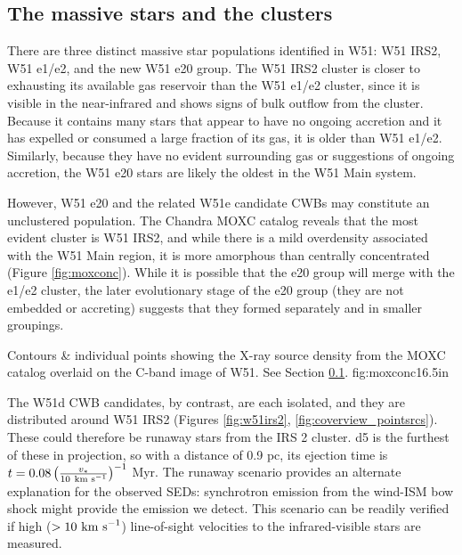 \subsection{The massive stars and the clusters}
\label{sec:mstarscluster}
There are three distinct massive star populations identified in W51: W51 IRS2,
W51 e1/e2, and the new W51 e20 group.  The W51 IRS2 cluster is closer to
exhausting its available gas reservoir than the W51 e1/e2 cluster, since it is
visible in the near-infrared and shows signs of bulk outflow from the cluster.
Because it contains many stars that appear to have no ongoing accretion and it
has expelled or consumed a large fraction of its gas, it is older than W51
e1/e2.  Similarly, because they have no evident surrounding gas or suggestions
of ongoing accretion, the W51 e20 stars are likely the oldest in the W51 Main
system.

However, W51 e20 and the related W51e candidate CWBs may constitute an
unclustered population.  The Chandra MOXC catalog \citep{Townsley2014a} reveals
that the most evident cluster is W51 IRS2, and while there is a mild
overdensity associated with the W51 Main region, it is more amorphous than
centrally concentrated (Figure \ref{fig:moxconc}).  While it is possible that
the e20 group will merge with the e1/e2 cluster, the later evolutionary stage
of the e20 group (they are not embedded or accreting) suggests that they formed
separately and in smaller groupings.

{Contours \& individual points showing the X-ray source density from the 
MOXC \citep{Townsley2014a} catalog overlaid on the C-band image of W51.
See Section \ref{sec:mstarscluster}.}
{fig:moxconc}{1}{6.5in}

The W51d CWB candidates, by contrast, are each isolated, and they are
distributed around W51 IRS2 (Figures \ref{fig:w51irs2},
\ref{fig:coverview_pointsrcs}).  These could therefore be runaway stars from
the IRS 2 cluster.  d5 is the furthest of these in projection, so with a
distance of 0.9 pc, its ejection time is $t = 0.08 \left(\frac{v_*}{10
~\textrm{km~s}^{-1}}\right)^{-1}$ Myr.  The runaway scenario provides an alternate
explanation for the observed SEDs: synchrotron emission from the wind-ISM
bow shock might provide the emission we detect.  This scenario can be readily
verified if high ($>10~\textrm{km~s}^{-1}$) line-of-sight velocities to the infrared-visible
stars are measured.


